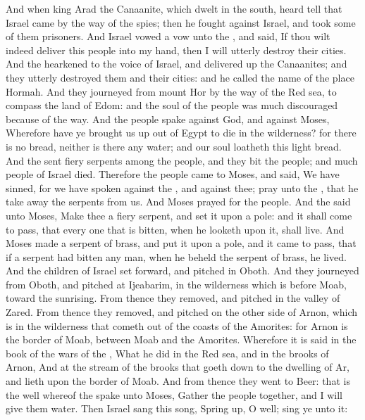 \begin{biblechapter} %
 And when king Arad the Canaanite, which dwelt in the south, heard tell that Israel came by the way of the spies; then he fought against Israel, and took some of them prisoners.
\verse And Israel vowed a vow unto the \LORD, and said, If thou wilt indeed deliver this people into my hand, then I will utterly destroy their cities.
\verse And the \LORD hearkened to the voice of Israel, and delivered up the Canaanites; and they utterly destroyed them and their cities: and he called the name of the place Hormah.
\verse And they journeyed from mount Hor by the way of the Red sea, to compass the land of Edom: and the soul of the people was much discouraged because of the way.
\verse And the people spake against God, and against Moses, Wherefore have ye brought us up out of Egypt to die in the wilderness? for there is no bread, neither is there any water; and our soul loatheth this light bread.
\verse And the \LORD sent fiery serpents among the people, and they bit the people; and much people of Israel died.
\verse Therefore the people came to Moses, and said, We have sinned, for we have spoken against the \LORD, and against thee; pray unto the \LORD, that he take away the serpents from us. And Moses prayed for the people.
\verse And the \LORD said unto Moses, Make thee a fiery serpent, and set it upon a pole: and it shall come to pass, that every one that is bitten, when he looketh upon it, shall live.
\verse And Moses made a serpent of brass, and put it upon a pole, and it came to pass, that if a serpent had bitten any man, when he beheld the serpent of brass, he lived.
 And the children of Israel set forward, and pitched in Oboth.
\verse And they journeyed from Oboth, and pitched at Ijeabarim, in the wilderness which is before Moab, toward the sunrising.
\verse From thence they removed, and pitched in the valley of Zared.
\verse From thence they removed, and pitched on the other side of Arnon, which is in the wilderness that cometh out of the coasts of the Amorites: for Arnon is the border of Moab, between Moab and the Amorites.
\verse Wherefore it is said in the book of the wars of the \LORD, What he did in the Red sea, and in the brooks of Arnon,
\verse And at the stream of the brooks that goeth down to the dwelling of Ar, and lieth upon the border of Moab.
\verse And from thence they went to Beer: that is the well whereof the \LORD spake unto Moses, Gather the people together, and I will give them water.
\verse Then Israel sang this song, Spring up, O well; sing ye unto it:

\end{biblechapter}
